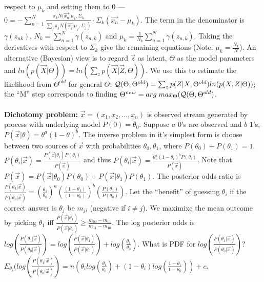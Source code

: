 respect to $\mu_k$ and setting them to $0$ --- 
$0= - \sum_{n=1}^N  {\frac {\pi_k N({\vec {x_n}}| \mu_k, \Sigma_k}
{\sum_j \pi_j N({\vec {x_j}}| \mu_j, \Sigma_j)}} \cdot 
\Sigma_k ({\vec {x_n}}- \mu_k)$.  The term in the denominator is 
$\gamma(z_{nk})$, $N_k= \sum_{n=1}^N \gamma(z_{n,k})$ and 
$\mu_k = {\frac 1 {N_k}} \sum_{n=1}^N \gamma(z_{n,k})$.  Taking the derivatives with respect
to $\Sigma_k$ give the remaining equations (Note: $\mu_k= {\frac {N_k} {N}}$).
An alternative (Bayesian) 
view is to regard ${\vec z}$ as latent, $\Theta$ as the model parameters
and $ln(p({\vec X} | \Theta))= ln(\sum_z p({\vec X} | {\vec Z}, \Theta))$.  We use
this to estimate the likelihood from $\Theta^{old}$ for general $\Theta$:
${\cal Q}(\Theta, \Theta^{old})= \sum_z p(Z| X, \Theta^{old}) ln(p(X,Z| \Theta))$; the
``M'' step corresponds to finding 
$\Theta^{new}= arg \; max_{\Theta} ({\cal Q} (\Theta, \Theta^{old})$.
\\
\\
{\bf Dichotomy problem:} ${\vec x}= (x_1 , x_2 , \ldots, x_n)$ is observed stream generated
by process with underlying model $P(0)= \theta_0$.  Suppose $a$ $0$'s are observed and $b$ $1$'s,
$P({\vec x}| \theta) = \theta^a (1-\theta)^b$.  The inverse problem in it's simplest form is
choose between two sources of ${\vec x}$ with probabilities $\theta_0 , \theta_1$, where
$P(\theta_0)+P(\theta_1)=1$.  
$P(\theta_i | {\vec x})= {\frac {P({\vec x} | \theta_i) P(\theta_i)} {P({\vec x})}}$ and thus
$P(\theta_i | {\vec x})= {\frac {\theta_i^a (1- \theta_i)^b P(\theta_i)} {P({\vec x})}}$.
Note that
$P({\vec x})= P({\vec x}|\theta_0) P(\theta_0)+ P({\vec x}|\theta_1) P(\theta_1)$.
The posterior odds ratio is
${\frac {P(\theta_1|{\vec x})} {P(\theta_0|{\vec x})}}=
({\frac {\theta_1} {\theta_0}})^a 
({\frac {(1-\theta_1)} {(1-\theta_0)}})^b 
({\frac {P(\theta_1)} {P(\theta_0)}})$.  Let the ``benefit'' of guessing $\theta_i$ if the
correct answer is $\theta_j$ be $m_{ji}$ (negative if $i \ne j$).  We maximixe 
the mean outcome by picking $\theta_1$ iff 
${\frac {P({\vec x}|\theta_1)} {P({\vec x}|\theta_0)} } \ge {\frac {m_{00}-m_{01}} {m_{11}-m_{10}}}$.
The log posterior odds is
$log({\frac {P(\theta_1|{\vec x})} {P(\theta_0|{\vec x})}})=
log({\frac {P({\vec x}|\theta_1)} {P({\vec x}|\theta_0)}})+
log({\frac {\theta_1} {\theta_0}})
$.  What is PDF for
$log({\frac {P(\theta_1|{\vec x})} {P(\theta_0|{\vec x})}})$?
$E_{\theta_i}(
log({\frac {P(\theta_1|{\vec x})} {P(\theta_0|{\vec x})}})
= n( \theta_i log({\frac {\theta_i} {\theta_0}}) + 
(1-\theta_i)
log({\frac {1-\theta_i} {1-\theta_0}})) + c$. 
